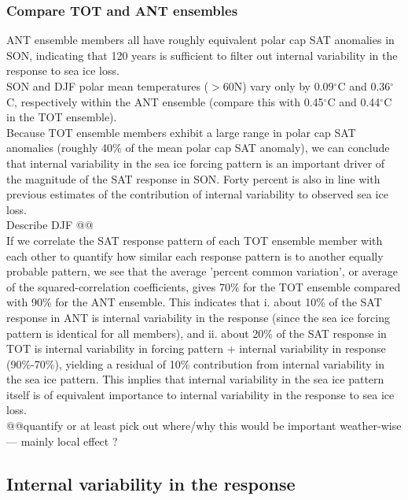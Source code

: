 \documentclass[twocol]{ametsoc}
\begin{document}
\subsubsection{Compare TOT and ANT ensembles}
ANT ensemble members all have roughly equivalent polar cap SAT anomalies in SON, indicating that 120 years is sufficient to filter out internal variability in the response to sea ice loss. \\
SON and DJF polar mean temperatures ($>$60N) vary only by 0.09$^\circ$C and 0.36$^\circ$C, respectively within the ANT ensemble (compare this with 0.45$^\circ$C and 0.44$^\circ$C in the TOT ensemble).  \\
Because TOT ensemble members exhibit a large range in polar cap SAT anomalies (roughly 40\% of the mean polar cap SAT anomaly), we can conclude that internal variability in the sea ice forcing pattern is an important driver of the magnitude of the SAT response in SON. Forty percent is also in line with previous estimates of the contribution of internal variability to observed sea ice loss. \\
Describe DJF @@ \\
If we correlate the SAT response pattern of each TOT ensemble member with each other to quantify how similar each response pattern is to another equally probable pattern, we see that the average 'percent common variation', or average of the squared-correlation coefficients, gives 70\% for the TOT ensemble compared with 90\% for the ANT ensemble. This indicates that i. about 10\% of the SAT response in ANT is internal variability in the response (since the sea ice forcing pattern is identical for all members), and ii. about 20\% of the SAT response in TOT is internal variability in forcing pattern + internal variability in response (90\%-70\%), yielding a residual of 10\% contribution from internal variability in the sea ice pattern. This implies that internal variability in the sea ice pattern itself is of equivalent importance to internal variability in the response to sea ice loss.\\
@@quantify or at least pick out where/why this would be important weather-wise --- mainly local effect ?
 

\subsection{Internal variability in the response}
\end{document}
